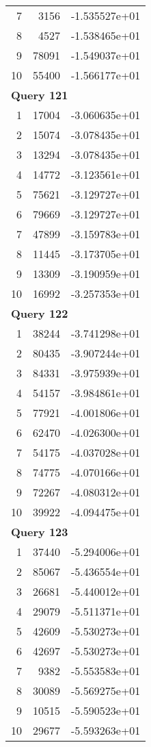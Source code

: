 \begin{longtable}[{p}]{@{}rrp{}@{}}
7 & 3156 & -1.535527e+01 \\
8 & 4527 & -1.538465e+01 \\
9 & 78091 & -1.549037e+01 \\
10 & 55400 & -1.566177e+01 \\
\midrule
\multicolumn{3}{l}{\bfseries Query 121} \\
1 & 17004 & -3.060635e+01 \\
2 & 15074 & -3.078435e+01 \\
3 & 13294 & -3.078435e+01 \\
4 & 14772 & -3.123561e+01 \\
5 & 75621 & -3.129727e+01 \\
6 & 79669 & -3.129727e+01 \\
7 & 47899 & -3.159783e+01 \\
8 & 11445 & -3.173705e+01 \\
9 & 13309 & -3.190959e+01 \\
10 & 16992 & -3.257353e+01 \\
\midrule
\multicolumn{3}{l}{\bfseries Query 122} \\
1 & 38244 & -3.741298e+01 \\
2 & 80435 & -3.907244e+01 \\
3 & 84331 & -3.975939e+01 \\
4 & 54157 & -3.984861e+01 \\
5 & 77921 & -4.001806e+01 \\
6 & 62470 & -4.026300e+01 \\
7 & 54175 & -4.037028e+01 \\
8 & 74775 & -4.070166e+01 \\
9 & 72267 & -4.080312e+01 \\
10 & 39922 & -4.094475e+01 \\
\midrule
\multicolumn{3}{l}{\bfseries Query 123} \\
1 & 37440 & -5.294006e+01 \\
2 & 85067 & -5.436554e+01 \\
3 & 26681 & -5.440012e+01 \\
4 & 29079 & -5.511371e+01 \\
5 & 42609 & -5.530273e+01 \\
6 & 42697 & -5.530273e+01 \\
7 & 9382 & -5.553583e+01 \\
8 & 30089 & -5.569275e+01 \\
9 & 10515 & -5.590523e+01 \\
10 & 29677 & -5.593263e+01 \\

\end{longtable}
